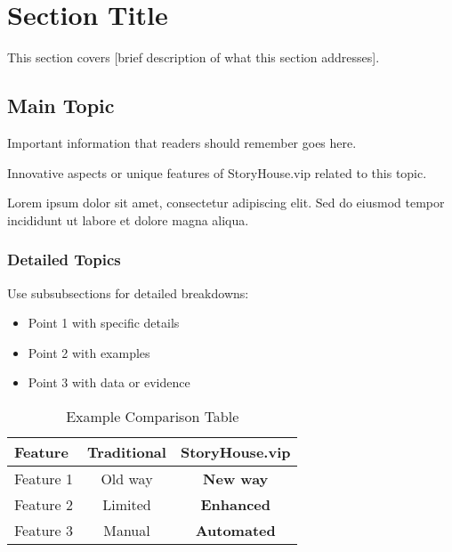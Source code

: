 
\section{Section Title}
\label{sec:section-label}

This section covers [brief description of what this section addresses].

\subsection{Main Topic}

\begin{keypoint}
Important information that readers should remember goes here.
\end{keypoint}

\begin{innovation}
Innovative aspects or unique features of StoryHouse.vip related to this topic.
\end{innovation}

Lorem ipsum dolor sit amet, consectetur adipiscing elit. Sed do eiusmod tempor incididunt ut labore et dolore magna aliqua.

\subsubsection{Detailed Topics}

Use subsubsections for detailed breakdowns:

\begin{itemize}
    \item Point 1 with specific details
    \item Point 2 with examples
    \item Point 3 with data or evidence
\end{itemize}

\begin{table}[H]
\centering
\caption{Example Comparison Table}
\label{tab:example-table}
\begin{tabular}{@{}lcc@{}}
\toprule
\textbf{Feature} & \textbf{Traditional} & \textbf{StoryHouse.vip} \\
\midrule
Feature 1 & Old way & \textbf{New way} \\
Feature 2 & Limited & \textbf{Enhanced} \\
Feature 3 & Manual & \textbf{Automated} \\
\bottomrule
\end{tabular}
\end{table}

